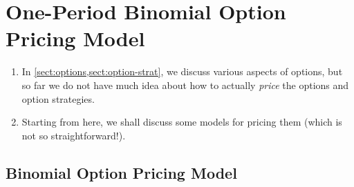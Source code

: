 \section{One-Period Binomial Option Pricing Model}
\label{sect:one-period-binom}
\begin{enumerate}
\item In \cref{sect:options,sect:option-strat}, we discuss various aspects of
options, but so far we do not have much idea about how to actually \emph{price}
the options and option strategies.

\item Starting from here, we shall discuss some models for pricing them (which
is not so straightforward!).
\end{enumerate}

\subsection{Binomial Option Pricing Model}
